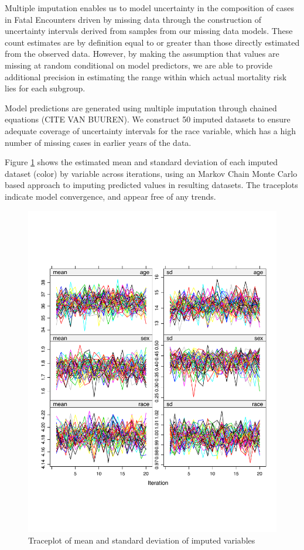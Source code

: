 \documentclass{article}
\begin{document}
Multiple imputation enables us to model uncertainty in the composition of cases in Fatal Encounters driven by missing data through the construction of uncertainty intervals derived from samples from our missing data models. These count estimates are by definition equal to or greater than those directly estimated from the observed data. However, by making the assumption that values are missing at random conditional on model predictors, we are able to provide additional precision in estimating the range within which actual mortality risk lies for each subgroup. 

Model predictions are generated using multiple imputation through chained equations (CITE VAN BUUREN). We construct 50 imputed datasets to ensure adequate coverage of uncertainty intervals for the race variable, which has a high number of missing cases in earlier years of the data. 

Figure \ref{fig:traceplot} shows the estimated mean and standard deviation of each imputed dataset (color) by variable across iterations, using an Markov Chain Monte Carlo based approach to imputing predicted values in resulting datasets. The traceplots indicate model convergence, and appear free of any trends. 

\begin{figure}
	\centering
	\includegraphics[width = \linewidth]{vis/imp_trace_1.pdf}
	\caption{Traceplot of mean and standard deviation of imputed variables}
	\label{fig:traceplot}
\end{figure}
\end{document}
